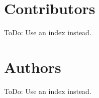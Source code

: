 %                                                    
%                                                    
%                                                    
\contributors

\chapter{Contributors}

\begin{thecontriblist}
ToDo: Use an index instead.
\end{thecontriblist}


\chapter{Authors}

ToDo: Use an index instead.